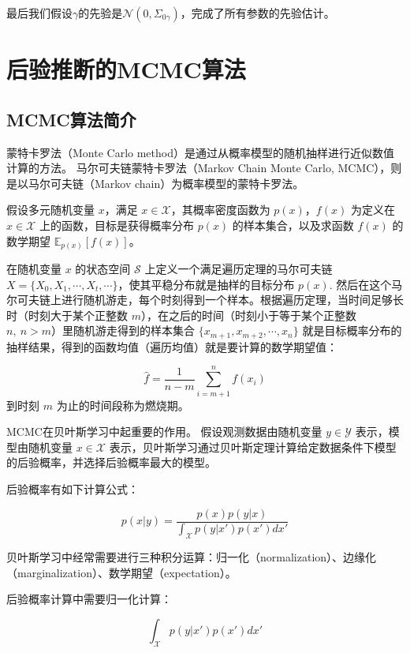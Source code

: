 \documentclass[AutoFakeBold]{LZUThesis}
\newcommand{\scite}[1]{\textsuperscript{\cite{#1}}}
\begin{document}
最后我们假设$\gamma$的先验是$\mathcal{N}(0,\Sigma_{0\gamma})$，完成了所有参数的先验估计。

\section{后验推断的MCMC算法}
\subsection{MCMC算法简介\scite{李航2019统计学习方法}}
蒙特卡罗法（Monte Carlo method）是通过从概率模型的随机抽样进行近似数值计算的方法。 马尔可夫链蒙特卡罗法（Markov Chain Monte Carlo, MCMC），则是以马尔可夫链（Markov chain）为概率模型的蒙特卡罗法。

假设多元随机变量 $x$，满足 $x \in \mathcal{X}$，其概率密度函数为 $p(x)$，$f(x)$ 为定义在 $x \in \mathcal{X}$ 上的函数，目标是获得概率分布 $p(x)$ 的样本集合，以及求函数 $f(x)$ 的数学期望 $\mathbb{E}_{p(x)}[f(x)]$。

在随机变量 $x$ 的状态空间 $\mathcal{S}$ 上定义一个满足遍历定理的马尔可夫链 $X = \{X_0, X_1, \cdots, X_t, \cdots\}$，使其平稳分布就是抽样的目标分布 $p(x)$. 然后在这个马尔可夫链上进行随机游走，每个时刻得到一个样本。根据遍历定理，当时间足够长时（时刻大于某个正整数 $m$），在之后的时间（时刻小于等于某个正整数 $n,\ n > m$）里随机游走得到的样本集合 $\{x_{m+1}, x_{m+2}, \cdots, x_n\}$ 就是目标概率分布的抽样结果，得到的函数均值（遍历均值）就是要计算的数学期望值：

\begin{equation}
	\hat{f} = \frac{1}{n - m} \sum_{i = m+1}^{n} f(x_i) 
\end{equation}
到时刻 $m$ 为止的时间段称为燃烧期。

MCMC在贝叶斯学习中起重要的作用。
假设观测数据由随机变量 $y \in \mathcal{Y}$ 表示，模型由随机变量 $x \in \mathcal{X}$ 表示，贝叶斯学习通过贝叶斯定理计算给定数据条件下模型的后验概率，并选择后验概率最大的模型。

后验概率有如下计算公式：

\begin{equation}
	p(x|y) = \frac{p(x)p(y|x)}{\int_{\mathcal{X}} p(y|x')p(x') dx'} \label{Equation:posterior}
\end{equation}

贝叶斯学习中经常需要进行三种积分运算：归一化（normalization）、边缘化（marginalization）、数学期望（expectation）。

后验概率计算中需要归一化计算：

\begin{equation}
	\int_{\mathcal{X}} p(y|x')p(x') dx' \label{Equation:normalization}
\end{equation}
\end{document}
